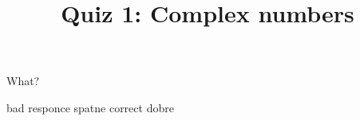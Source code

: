 \documentclass{webquiz}
\title{Quiz 1: Complex numbers}
\begin{document}
\begin{question} %
	What?
	\begin{choice}
		\incorrect bad responce
		\feedback spatne
		\correct correct
		\feedback dobre
	\end{choice}
\end{question}
\end{document}
